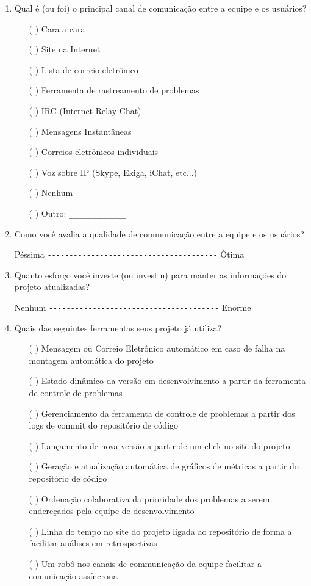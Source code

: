 \begin{enumerate}
\item Qual é (ou foi) o principal canal de comunicação entre a equipe e os
  usuários?
  \begin{itemize}
  \item[( )] Cara a cara
  \item[( )] Site na Internet
  \item[( )] Lista de correio eletrônico
  \item[( )] Ferramenta de rastreamento de problemas
  \item[( )] IRC (Internet Relay Chat)
  \item[( )] Mensagens Instantâneas
  \item[( )] Correios eletrônicos individuais
  \item[( )] Voz sobre IP (Skype, Ekiga, iChat, etc...)
  \item[( )] Nenhum
  \item[( )] Outro: \verb=_____________=
  \end{itemize}

\item Como você avalia a qualidade de communicação entre a equipe e os
  usuários?

  Péssima \verb=---------------------------------------= Ótima

\item Quanto esforço você investe (ou investiu) para manter as
  informações do projeto atualizadas?

  Nenhum \verb=---------------------------------------= Enorme

\item Quais das seguintes ferramentas seus projeto já utiliza?
  \begin{itemize}
  \item[( )] Mensagem ou Correio Eletrônico automático em caso de
    falha na montagem automática do projeto
  \item[( )] Estado dinâmico da versão em desenvolvimento a partir da
    ferramenta de controle de problemas
  \item[( )] Gerenciamento da ferramenta de controle de problemas a
    partir dos logs de commit do repositório de código
  \item[( )] Lançamento de nova versão a partir de um click no site do
    projeto
  \item[( )] Geração e atualização automática de gráficos de métricas
    a partir do repositório de código
  \item[( )] Ordenação colaborativa da prioridade dos problemas a
    serem endereçados pela equipe de desenvolvimento
  \item[( )] Linha do tempo no site do projeto ligada ao repositório
    de forma a facilitar análises em retrospectivas
  \item[( )] Um robô nos canais de communicação da equipe facilitar a
    comunicação assíncrona
  \end{itemize}


\end{enumerate}
